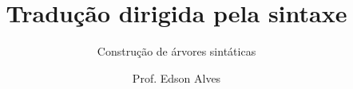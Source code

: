 \title{Tradução dirigida pela sintaxe}
\subtitle{Construção de árvores sintáticas}
\date{}
\author{Prof. Edson Alves}

